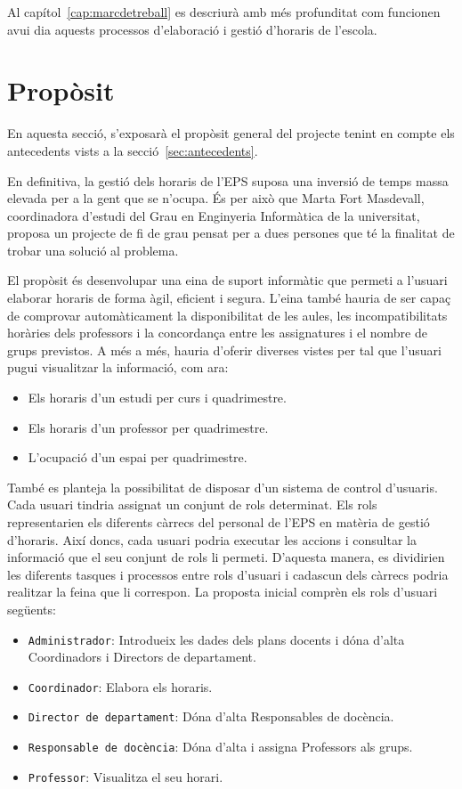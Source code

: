 \documentclass[a4paper,12pt]{ThesisStyle}
\begin{document}
Al capítol~\ref{cap:marcdetreball} es descriurà amb més profunditat com funcionen avui dia aquests processos d'elaboració i gestió d'horaris de l'escola.

\section{Propòsit}
\label{sec:proposit}

En aquesta secció, s'exposarà el propòsit general del projecte tenint en compte els antecedents vists a la secció~\ref{sec:antecedents}.

En definitiva, la gestió dels horaris de l'EPS suposa una inversió de temps massa elevada per a la gent que se n'ocupa. És per això que Marta Fort Masdevall, coordinadora d'estudi del Grau en Enginyeria Informàtica de la universitat, proposa un projecte de fi de grau pensat per a dues persones que té la finalitat de trobar una solució al problema.

El propòsit és desenvolupar una eina de suport informàtic que permeti a l'usuari elaborar horaris de forma àgil, eficient i segura. L'eina també hauria de ser capaç de comprovar automàticament la disponibilitat de les aules, les incompatibilitats horàries dels professors i la concordança entre les assignatures i el nombre de grups previstos. A més a més, hauria d'oferir diverses vistes per tal que l'usuari pugui visualitzar la informació, com ara:
\begin{itemize}
  \item Els horaris d'un estudi per curs i quadrimestre.
  \item Els horaris d'un professor per quadrimestre.
  \item L'ocupació d'un espai per quadrimestre.
\end{itemize}

També es planteja la possibilitat de disposar d'un sistema de control d'usuaris. Cada usuari tindria assignat un conjunt de rols determinat. Els rols representarien els diferents càrrecs del personal de l'EPS en matèria de gestió d'horaris. Així doncs, cada usuari podria executar les accions i consultar la informació que el seu conjunt de rols li permeti. D'aquesta manera, es dividirien les diferents tasques i processos entre rols d'usuari i cadascun dels càrrecs podria realitzar la feina que li correspon. La proposta inicial comprèn els rols d'usuari següents:
\begin{itemize}
  \item \texttt{Administrador}: Introdueix les dades dels plans docents i dóna d'alta Coordinadors i Directors de departament.
  \item \texttt{Coordinador}: Elabora els horaris.
  \item \texttt{Director de departament}: Dóna d'alta Responsables de docència.
  \item \texttt{Responsable de docència}: Dóna d'alta i assigna Professors als grups.
  \item \texttt{Professor}: Visualitza el seu horari.
\end{itemize}
\end{document}
